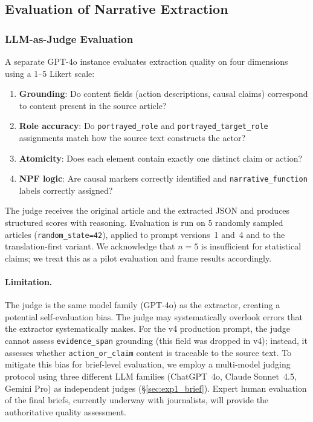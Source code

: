 \documentclass[10pt, a4paper]{article}
\begin{document}
\subsection{Evaluation of Narrative Extraction}
\label{sec:eval_extraction}

\subsubsection{LLM-as-Judge Evaluation}
\label{sec:llm_judge}

A separate GPT-4o instance evaluates extraction quality on four dimensions using a 1--5 Likert scale:

\begin{enumerate}
\item \textbf{Grounding}: Do content fields (action descriptions, causal claims) correspond to content present in the source article?
\item \textbf{Role accuracy}: Do \texttt{portrayed\_role} and \texttt{portrayed\_target\_role} assignments match how the source text constructs the actor?
\item \textbf{Atomicity}: Does each element contain exactly one distinct claim or action?
\item \textbf{NPF logic}: Are causal markers correctly identified and \texttt{narrative\_function} labels correctly assigned?
\end{enumerate}

The judge receives the original article and the extracted JSON and produces structured scores with reasoning. Evaluation is run on 5 randomly sampled articles (\texttt{random\_state=42}), applied to prompt versions~1 and~4 and to the translation-first variant. We acknowledge that $n=5$ is insufficient for statistical claims; we treat this as a pilot evaluation and frame results accordingly.

\paragraph{Limitation.}
The judge is the same model family (GPT-4o) as the extractor, creating a potential self-evaluation bias. The judge may systematically overlook errors that the extractor systematically makes. For the v4 production prompt, the judge cannot assess \texttt{evidence\_span} grounding (this field was dropped in v4); instead, it assesses whether \texttt{action\_or\_claim} content is traceable to the source text. To mitigate this bias for brief-level evaluation, we employ a multi-model judging protocol using three different LLM families (ChatGPT~4o, Claude Sonnet~4.5, Gemini Pro) as independent judges (\S\ref{sec:exp1_brief}). Expert human evaluation of the final briefs, currently underway with journalists, will provide the authoritative quality assessment.
\end{document}
